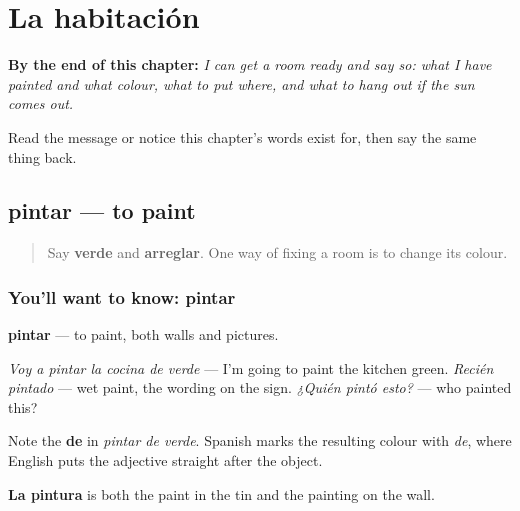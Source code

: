 
\chapter{La habitación}
\label{ch:es-cuarto}

\begin{chapteropening}
\textbf{By the end of this chapter:} \emph{I can get a room ready and say so: what I have painted and what colour, what to put where, and what to hang out if the sun comes out.}

Read the message or notice this chapter's words exist for, then say the same thing back.
\end{chapteropening}

\section[pintar]{pintar — to paint}

\label{lesson:ES-C455-pintar}



\begin{quote}
Say \textbf{verde} and \textbf{arreglar}. One way of fixing a room is to change its colour.
\end{quote}

\subsection*{You'll want to know: pintar}
\textbf{pintar} — to paint, both walls and pictures.

\emph{Voy a pintar la cocina de verde} — I'm going to paint the kitchen green. \emph{Recién pintado} — wet paint, the wording on the sign. \emph{¿Quién pintó esto?} — who painted this?

Note the \textbf{de} in \emph{pintar de verde}. Spanish marks the resulting colour with \emph{de}, where English puts the adjective straight after the object.

\textbf{La pintura} is both the paint in the tin and the painting on the wall.

